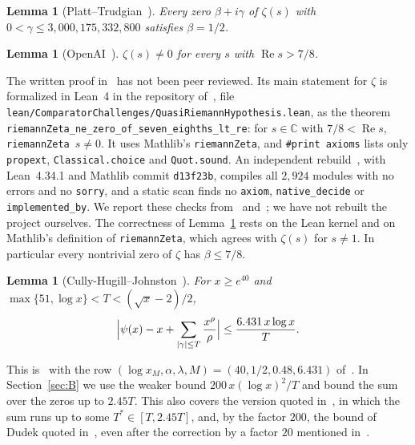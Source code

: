 \documentclass{amsart}
\newtheorem{lemma}[theorem]{Lemma}
\theoremstyle{definition}
\theoremstyle{remark}
\theoremstyle{plain}
\numberwithin{equation}{section}
\newcommand{\HRH}{3{,}000{,}175{,}332{,}800}
\begin{document}
\begin{lemma}[Platt--Trudgian~\cite{PT21a}]\label{lem:PT}
Every zero $\beta+i\gamma$ of $\zeta(s)$ with $0<\gamma\le\HRH$ satisfies $\beta=1/2$.
\end{lemma}

\begin{lemma}[OpenAI~\cite{OAI26}]\label{lem:OAI}
$\zeta(s)\ne0$ for every $s$ with $\operatorname{Re}s>7/8$.
\end{lemma}

The written proof in~\cite{OAI26} has not been peer reviewed. Its main statement for $\zeta$ is formalized in Lean~4 in the repository of~\cite{OAI26}, file \texttt{lean/Comparator\-Challenges/Quasi\-Riemann\-Hypothesis.lean}, as the theorem \texttt{riemannZeta\_ne\_zero\_of\_seven\_eighths\_lt\_re}: for $s\in\mathbb C$ with $7/8<\operatorname{Re}s$, \texttt{riemannZeta}~$s\ne0$. It uses Mathlib's \texttt{riemannZeta}, and \texttt{\#print axioms} lists only \texttt{propext}, \texttt{Classical.choice} and \texttt{Quot.sound}. An independent rebuild~\cite{Tom26}, with Lean~4.34.1 and Mathlib commit \texttt{d13f23b}, compiles all $2{,}924$ modules with no errors and no \texttt{sorry}, and a static scan finds no \texttt{axiom}, \texttt{native\_decide} or \texttt{implemented\_by}. We report these checks from~\cite{OAI26} and~\cite{Tom26}; we have not rebuilt the project ourselves. The correctness of Lemma~\ref{lem:OAI} rests on the Lean kernel and on Mathlib's definition of \texttt{riemannZeta}, which agrees with $\zeta(s)$ for $s\ne1$. In particular every nontrivial zero of $\zeta$ has $\beta\le7/8$.

\begin{lemma}[Cully-Hugill--Johnston~{\cite[Thm.~1.2, Table~4]{CHJ23}}]\label{lem:CHJ}
For $x\ge e^{40}$ and $\max\{51,\log x\}<T<(\sqrt x-2)/2$,
\[
\Bigl|\psi(x)-x+\sum_{|\gamma|\le T}\frac{x^\rho}{\rho}\Bigr|\le\frac{6.431\,x\log x}{T}.
\]
\end{lemma}

This is~\cite[Thm.~1.2]{CHJ23} with the row $(\log x_M,\alpha,\lambda,M)=(40,1/2,0.48,6.431)$ of~\cite[Table~4]{CHJ23}. In Section~\ref{sec:B} we use the weaker bound $200\,x(\log x)^2/T$ and bound the sum over the zeros up to $2.45T$. This also covers the version quoted in~\cite[Thm.~3.2]{FKS23}, in which the sum runs up to some $T^*\in[T,2.45T]$, and, by the factor $200$, the bound of Dudek quoted in~\cite[Prop.~3.4]{FKS23}, even after the correction by a factor $20$ mentioned in~\cite[Remark~3.3]{FKS23}.
\end{document}
